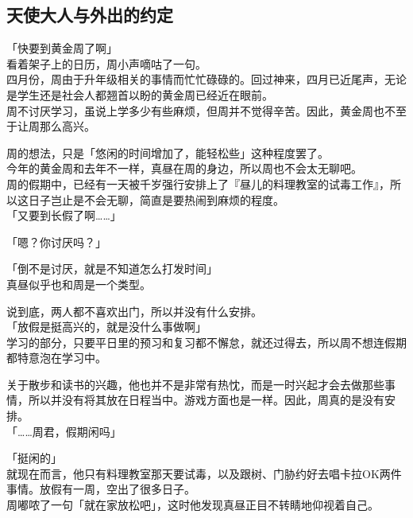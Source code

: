 \subsection{天使大人与外出的约定}

「快要到黄金周了啊」\\

看着架子上的日历，周小声嘀咕了一句。\\

四月份，周由于升年级相关的事情而忙忙碌碌的。回过神来，四月已近尾声，无论是学生还是社会人都翘首以盼的黄金周已经近在眼前。\\

周不讨厌学习，虽说上学多少有些麻烦，但周并不觉得辛苦。因此，黄金周也不至于让周那么高兴。

周的想法，只是「悠闲的时间增加了，能轻松些」这种程度罢了。\\

今年的黄金周和去年不一样，真昼在周的身边，所以周也不会太无聊吧。\\

周的假期中，已经有一天被千岁强行安排上了『昼儿的料理教室的试毒工作』，所以这日子岂止是不会无聊，简直是要热闹到麻烦的程度。\\

「又要到长假了啊……」

「嗯？你讨厌吗？」

「倒不是讨厌，就是不知道怎么打发时间」\\

真昼似乎也和周是一个类型。

说到底，两人都不喜欢出门，所以并没有什么安排。\\

「放假是挺高兴的，就是没什么事做啊」\\

学习的部分，只要平日里的预习和复习都不懈怠，就还过得去，所以周不想连假期都特意泡在学习中。

关于散步和读书的兴趣，他也并不是非常有热忱，而是一时兴起才会去做那些事情，所以并没有将其放在日程当中。游戏方面也是一样。因此，周真的是没有安排。\\

「……周君，假期闲吗」

「挺闲的」\\

就现在而言，他只有料理教室那天要试毒，以及跟树、门胁约好去唱卡拉OK两件事情。放假有一周，空出了很多日子。\\

周嘟哝了一句「就在家放松吧」，这时他发现真昼正目不转睛地仰视着自己。\\

